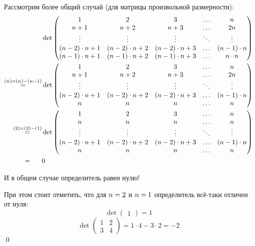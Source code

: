 \documentclass[a4paper,12pt]{article}
\begin{document}
  Рассмотрим более общий случай (для матрицы произвольной размерности):
  \begin{equation*}
  \begin{split}
    &\det \begin{pmatrix}
      1                 & 2                 & 3                 & \ldots & n\\
      n + 1             & n + 2             & n + 3             & \ldots & 2n\\
      \vdots            & \vdots            & \vdots            & \ddots & \vdots\\
      (n-2) \cdot n + 1 & (n-2) \cdot n + 2 & (n-2) \cdot n + 3 & \ldots & (n - 1) \cdot n\\
      (n-1) \cdot n + 1 & (n-1) \cdot n + 2 & (n-1) \cdot n + 3 & \ldots & n \cdot n
    \end{pmatrix}\\
    \stackrel{(n) = (n) - (n - 1)}{=} &\det \begin{pmatrix}
      1                 & 2                 & 3                 & \ldots & n\\
      n + 1             & n + 2             & n + 3             & \ldots & 2n\\
      \vdots            & \vdots            & \vdots            & \ddots & \vdots\\
      (n-2) \cdot n + 1 & (n-2) \cdot n + 2 & (n-2) \cdot n + 3 & \ldots & (n - 1) \cdot n\\
      n                 & n                 & n                 & \ldots & n
    \end{pmatrix}\\
    \stackrel{(2) = (2) - (1)}{=} &\det \begin{pmatrix}
      1                 & 2                 & 3                 & \ldots & n\\
      n                 & n                 & n                 & \ldots & n\\
      \vdots            & \vdots            & \vdots            & \ddots & \vdots\\
      (n-2) \cdot n + 1 & (n-2) \cdot n + 2 & (n-2) \cdot n + 3 & \ldots & (n - 1) \cdot n\\
      n                 & n                 & n                 & \ldots & n
    \end{pmatrix}\\
    \stackrel{\hphantom{(3) = (3) - (2)}}{=} &0
  \end{split}
  \end{equation*}
  
  И в общем случае определитель равен нулю!
  
  При этом стоит отметить, что для $n \hm= 2$ и $n \hm= 1$ определитель всё-таки отличен от нуля:
  \[
    \det \begin{pmatrix} 1 \end{pmatrix} = 1
  \]
  \[
    \det \begin{pmatrix} 1 & 2\\ 3 & 4 \end{pmatrix} = 1 \cdot 4 - 3 \cdot 2 = -2
  \]
  \qed
  
\end{document}

